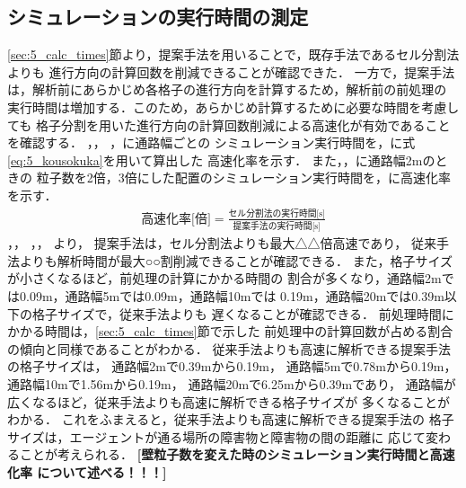 \clearpage
\subsection{シミュレーションの実行時間の測定}
\ref{sec:5_calc_times}節より，提案手法を用いることで，既存手法であるセル分割法よりも
進行方向の計算回数を削減できることが確認できた．
一方で，提案手法は，解析前にあらかじめ各格子の進行方向を計算するため，解析前の前処理の
実行時間は増加する．このため，あらかじめ計算するために必要な時間を考慮しても
格子分割を用いた進行方向の計算回数削減による高速化が有効であることを確認する．
，，
，に通路幅ごとの
シミュレーション実行時間を，に式\eqref{eq:5_kousokuka}を用いて算出した
高速化率を示す．
また，，に通路幅2mのときの
粒子数を2倍，3倍にした配置のシミュレーション実行時間を，に高速化率を示す．
%
\begin{align}
	\mbox{高速化率[倍]} = \frac{\mbox{セル分割法の実行時間[s]}}
    {\mbox{提案手法の実行時間[s]}}
    \label{eq:5_kousokuka}
\end{align}
%
，，
，，
より，
提案手法は，セル分割法よりも最大△△倍高速であり，
従来手法よりも解析時間が最大○○割削減できることが確認できる．
また，格子サイズが小さくなるほど，前処理の計算にかかる時間の
割合が多くなり，通路幅2mでは0.09m，通路幅5mでは0.09m，通路幅10mでは
0.19m，通路幅20mでは0.39m以下の格子サイズで，従来手法よりも
遅くなることが確認できる．
前処理時間にかかる時間は，\ref{sec:5_calc_times}節で示した
前処理中の計算回数が占める割合の傾向と同様であることがわかる．
従来手法よりも高速に解析できる提案手法の格子サイズは，
通路幅2mで0.39mから0.19m，
通路幅5mで0.78mから0.19m，
通路幅10mで1.56mから0.19m，
通路幅20mで6.25mから0.39mであり，
通路幅が広くなるほど，従来手法よりも高速に解析できる格子サイズが
多くなることがわかる．
これをふまえると，従来手法よりも高速に解析できる提案手法の
格子サイズは，エージェントが通る場所の障害物と障害物の間の距離に
応じて変わることが考えられる．
\textbf{[壁粒子数を変えた時のシミュレーション実行時間と高速化率
について述べる！！！]} 


